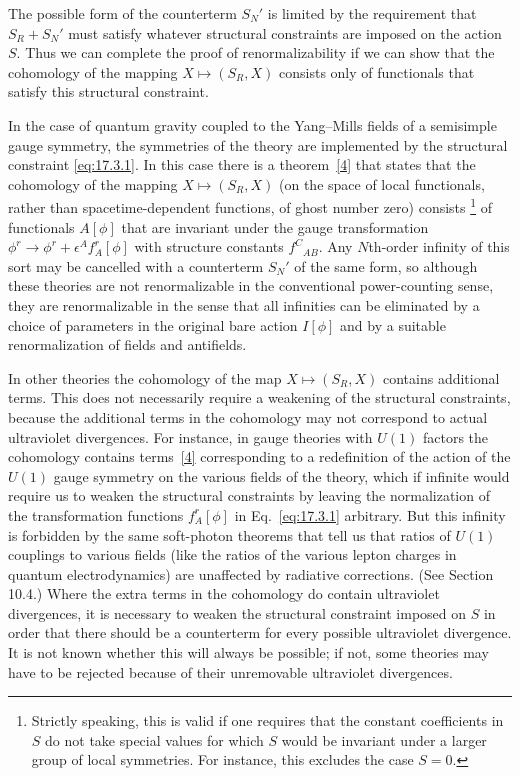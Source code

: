 The possible form of the counterterm $S_N'$ is limited by the requirement
that $S_R+S_N'$ must satisfy whatever structural constraints are imposed on
the action $S$. Thus we can complete the proof of renormalizability if we can
show that the cohomology of the mapping $X\longmapsto(S_R,X)$ consists only
of functionals that satisfy this structural constraint.

In the case of quantum gravity coupled to the Yang--Mills fields of a
semisimple gauge symmetry, the symmetries of the theory are implemented by
the structural constraint \eqref{eq:17.3.1}. In this case there is a
theorem~\hyperref[ch17-ref-4]{[4]} that states that the cohomology of the
mapping $X\longmapsto(S_R,X)$ (on the space of local functionals, rather
than spacetime-dependent functions, of ghost number zero) consists
\footnote{Strictly speaking, this is valid if one requires that the constant coefficients in $S$ do not take special values for which $S$ would be invariant under a larger group of local symmetries. For instance, this excludes the case $S=0$.}
of functionals $A[\phi]$ that are invariant under the gauge transformation
$\phi^r\longrightarrow\phi^r+\epsilon^A f_A^r[\phi]$ with structure constants
$f^C{}_{AB}$. Any $N$th-order infinity of this sort may be cancelled with a
counterterm $S_N'$ of the same form, so although these theories are not
renormalizable in the conventional power-counting sense, they are
renormalizable in the sense that all infinities can be eliminated by a
choice of parameters in the original bare action $I[\phi]$ and by a suitable
renormalization of fields and antifields.

In other theories the cohomology of the map $X\longmapsto(S_R,X)$ contains
additional terms. This does not necessarily require a weakening of the
structural constraints, because the additional terms in the cohomology may
not correspond to actual ultraviolet divergences. For instance, in gauge
theories with $U(1)$ factors the cohomology contains
terms~\hyperref[ch17-ref-4]{[4]} corresponding to a redefinition of the
action of the $U(1)$ gauge symmetry on the various fields of the theory,
which if infinite would require us to weaken the structural constraints by
leaving the normalization of the transformation functions $f_A^r[\phi]$ in
Eq.~\eqref{eq:17.3.1} arbitrary. But this infinity is forbidden by the same
soft-photon theorems that tell us that ratios of $U(1)$ couplings to various
fields (like the ratios of the various lepton charges in quantum
electrodynamics) are unaffected by radiative corrections. (See Section
10.4.) Where the extra terms in the cohomology do contain ultraviolet
divergences, it is necessary to weaken the structural constraint imposed on
$S$ in order that there should be a counterterm for every possible
ultraviolet divergence. It is not known whether this will always be
possible; if not, some theories may have to be rejected because of their
unremovable ultraviolet divergences.
